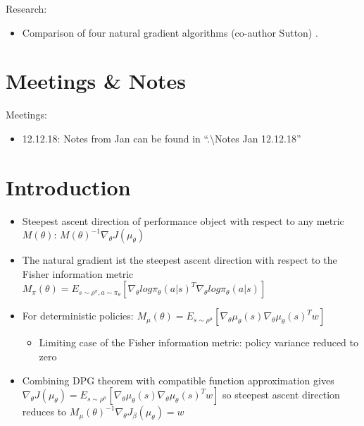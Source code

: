 \noindent Research:
\begin{itemize}
	\item Comparison of four natural gradient algorithms (co-author Sutton) \cite{bhatnagar2009natural}.
\end{itemize}

\section{Meetings \& Notes}

Meetings:
\begin{itemize}
	\item 12.12.18: Notes from Jan can be found in ``.\textbackslash Notes Jan 12.12.18''
\end{itemize}



\section{Introduction}
\label{intro}
\begin{itemize}
	\item Steepest ascent direction of performance object with respect to any metric $M(\theta)$: $M(\theta)^{-1}\nabla_{\theta}J(\mu_{\theta})$
	\item The natural gradient ist the steepest ascent direction with respect to the Fisher information metric $M_{\pi}(\theta)=E_{s\sim\rho^{\pi},a\sim\pi_{\theta}}[\nabla_{\theta}log\pi_{\theta}(a|s)^{T}\nabla_{\theta}log\pi_{\theta}(a|s)]$
	\item For deterministic policies: $M_{\mu}(\theta)=E_{s\sim\rho^{\mu}}[\nabla_{\theta}\mu_{\theta}(s)\nabla_{\theta}\mu_{\theta}(s)^{T}w]$
	\begin{itemize}
		\item Limiting case of the Fisher information metric: policy variance reduced to zero
	\end{itemize}
	\item Combining DPG theorem with compatible function approximation gives $\nabla_{\theta}J(\mu_{\theta})=E_{s\sim\rho^{\mu}}[\nabla_{\theta}\mu_{\theta}(s)\nabla_{\theta}\mu_{\theta}(s)^{T}w]$ so steepest ascent direction reduces to $M_{\mu}(\theta)^{-1}\nabla_{\theta}J_{\beta}(\mu_{\theta})=w$
\end{itemize}

